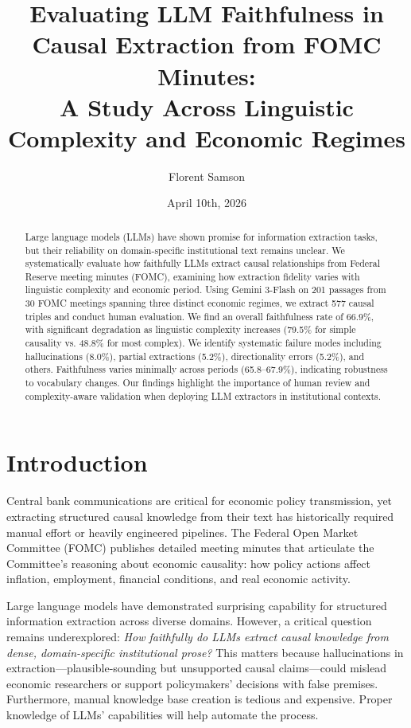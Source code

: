 \documentclass[11pt]{article}
\title{Evaluating LLM Faithfulness in Causal Extraction from FOMC Minutes: \\
        A Study Across Linguistic Complexity and Economic Regimes}
\author{Florent Samson}
\date{April 10th, 2026}
\begin{document}
\maketitle

\begin{abstract}
Large language models (LLMs) have shown promise for information extraction tasks, but their reliability on domain-specific institutional text remains unclear. We systematically evaluate how faithfully LLMs extract causal relationships from Federal Reserve meeting minutes (FOMC), examining how extraction fidelity varies with linguistic complexity and economic period. Using Gemini 3-Flash on 201 passages from 30 FOMC meetings spanning three distinct economic regimes, we extract 577 causal triples and conduct human evaluation. We find an overall faithfulness rate of 66.9\%, with significant degradation as linguistic complexity increases (79.5\% for simple causality vs. 48.8\% for most complex). We identify systematic failure modes including hallucinations (8.0\%), partial extractions (5.2\%), directionality errors (5.2\%), and others. Faithfulness varies minimally across periods (65.8--67.9\%), indicating robustness to vocabulary changes. Our findings highlight the importance of human review and complexity-aware validation when deploying LLM extractors in institutional contexts.
\end{abstract}

\section{Introduction}

Central bank communications are critical for economic policy transmission, yet extracting structured causal knowledge from their text has historically required manual effort or heavily engineered pipelines. The Federal Open Market Committee (FOMC) publishes detailed meeting minutes that articulate the Committee's reasoning about economic causality: how policy actions affect inflation, employment, financial conditions, and real economic activity.

Large language models have demonstrated surprising capability for structured information extraction across diverse domains. However, a critical question remains underexplored: \textit{How faithfully do LLMs extract causal knowledge from dense, domain-specific institutional prose?} This matters because hallucinations in extraction—plausible-sounding but unsupported causal claims—could mislead economic researchers or support policymakers' decisions with false premises. Furthermore, manual knowledge base creation is tedious and expensive. Proper knowledge of LLMs' capabilities will help automate the process.
\end{document}
